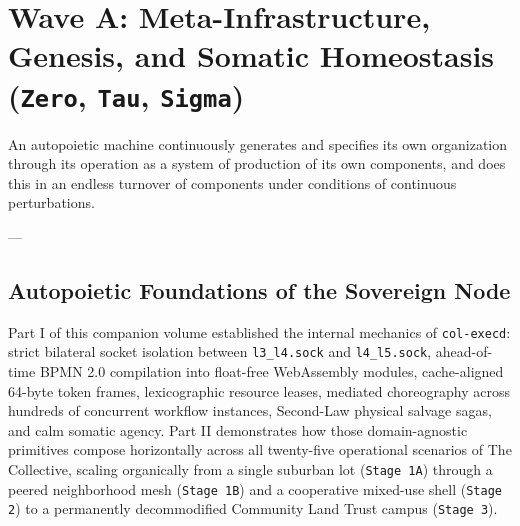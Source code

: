 \chapter{Wave A: Meta-Infrastructure, Genesis, and Somatic Homeostasis (\texttt{Zero}, \texttt{Tau}, \texttt{Sigma})}
\label{ch:wave-a}

\epigraph{An autopoietic machine continuously generates and specifies its own organization through its operation as a system of production of its own components, and does this in an endless turnover of components under conditions of continuous perturbations.}{--- \textcite{maturana1980}}

\section{Autopoietic Foundations of the Sovereign Node}
\label{sec:wave-a-intro}

Part I of this companion volume established the internal mechanics of \texttt{col-execd}: strict bilateral socket
isolation between \texttt{l3\_l4.sock} and \texttt{l4\_l5.sock}, ahead-of-time BPMN 2.0 compilation into float-free
WebAssembly modules, cache-aligned 64-byte token frames, lexicographic resource leases, mediated choreography across
hundreds of concurrent workflow instances, Second-Law physical salvage sagas, and calm somatic agency. Part II
demonstrates how those domain-agnostic primitives compose horizontally across all twenty-five operational scenarios of
The Collective, scaling organically from a single suburban lot (\texttt{Stage 1A}) through a peered neighborhood mesh
(\texttt{Stage 1B}) and a cooperative mixed-use shell (\texttt{Stage 2}) to a permanently decommodified Community Land
Trust campus (\texttt{Stage 3}).

